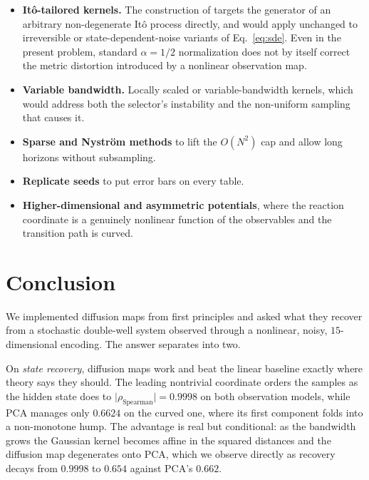 \documentclass[11pt]{article}
\begin{document}
\begin{itemize}
\item \textbf{It\^o-tailored kernels.} The construction of
\citet{banisch2017diffusion} targets the generator of an arbitrary
non-degenerate It\^o process directly, and would apply unchanged to irreversible
or state-dependent-noise variants of Eq.~\eqref{eq:sde}. Even in the present
problem, standard $\alpha=1/2$ normalization does not by itself correct the metric
distortion introduced by a nonlinear observation map.
\item \textbf{Variable bandwidth.} Locally scaled
\citep{rohrdanz2011determination} or variable-bandwidth
\citep{berry2016variable} kernels, which would address both the selector's
instability and the non-uniform sampling that causes it.
\item \textbf{Sparse and Nystr\"om methods} \citep{fowlkes2004spectral} to lift
the $O(N^2)$ cap and allow long horizons without subsampling.
\item \textbf{Replicate seeds} to put error bars on every table.
\item \textbf{Higher-dimensional and asymmetric potentials}, where the reaction
coordinate is a genuinely nonlinear function of the observables and the
transition path is curved.
\end{itemize}

\section{Conclusion}
\label{sec:conclusion}

We implemented diffusion maps from first principles and asked what they recover
from a stochastic double-well system observed through a nonlinear, noisy,
$15$-dimensional encoding. The answer separates into two.

On \emph{state recovery}, diffusion maps work and beat the linear baseline
exactly where theory says they should. The leading nontrivial coordinate orders
the samples as the hidden state does to
$\lvert\rho_{\mathrm{Spearman}}\rvert = 0.9998$ on both observation models, while
PCA manages only $0.6624$ on the curved one, where its first component folds into
a non-monotone hump. The advantage is real but conditional: as the bandwidth
grows the Gaussian kernel becomes affine in the squared distances and the
diffusion map degenerates onto PCA, which we observe directly as recovery decays
from $0.9998$ to $0.654$ against PCA's $0.662$.
\end{document}
